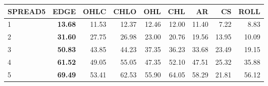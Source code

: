 \begin{table}[ht]
\centering
\begin{tabular}{lrrrrrrrr}
  \hline
SPREAD5 & EDGE & OHLC & CHLO & OHL & CHL & AR & CS & ROLL \\ 
  \hline
1 & \textbf{13.68} & 11.53 & 12.37 & 12.46 & 12.00 & 11.40 & 7.22 & 8.83 \\ 
  2 & \textbf{31.60} & 27.75 & 26.98 & 23.00 & 20.76 & 19.56 & 13.95 & 10.09 \\ 
  3 & \textbf{50.83} & 43.85 & 44.23 & 37.35 & 36.23 & 33.68 & 23.49 & 19.15 \\ 
  4 & \textbf{61.52} & 49.05 & 55.05 & 47.35 & 52.10 & 47.51 & 25.32 & 35.88 \\ 
  5 & \textbf{69.49} & 53.41 & 62.53 & 55.90 & 64.05 & 58.29 & 21.81 & 56.12 \\ 
   \hline
\end{tabular}
\end{table}
